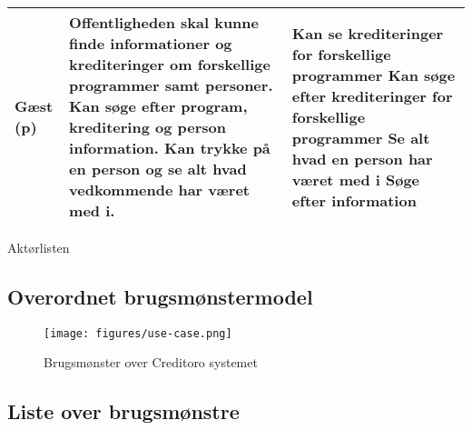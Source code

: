 {\begin{center}
\begin{tabular}{ |p{6cm}|p{6cm}|p{6cm}| }
\hline
Gæst (p) 
& Offentligheden skal kunne finde informationer og krediteringer om forskellige programmer samt personer. \newline Kan søge efter program, kreditering og person information. \newline Kan trykke på en person og se alt hvad vedkommende har været med i.
& Kan se krediteringer for forskellige programmer \newline Kan søge efter krediteringer for forskellige programmer \newline Se alt hvad en person har været med i \newline Søge efter information\\

\hline

\end{tabular}
\caption{Aktørlisten}
\label{table:aktørlist}
\end{center}}

\subsection{Overordnet brugsmønstermodel}
\begin{figure}[H]
\centering 
\texttt{[image: figures/use-case.png]}
\caption{Brugsmønster over Creditoro systemet}
\end{figure}

\subsection{Liste over brugsmønstre}

